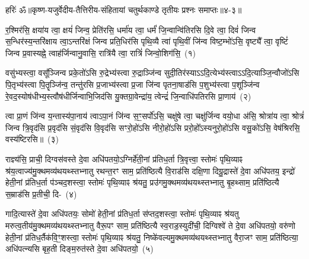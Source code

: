 {हरिः॑ ॐ}{॥कृष्ण-यजुर्वेदीय-तैत्तिरीय-संहितायां चतुर्थकाण्डे तृतीयः प्रश्नः समाप्तः॥४-३॥}

\setcounter{anuvakam}{0}
र॒श्मिर॑सि॒ क्षया॑य त्वा॒ क्षयं॑ जिन्व॒ प्रेति॑रसि॒ धर्मा॑य त्वा॒ धर्मं॑ जि॒न्वान्वि॑तिरसि दि॒वे त्वा॒ दिवं॑ जिन्व स॒न्धिर॑स्य॒न्तरि॑क्षाय त्वा॒ऽन्तरि॑क्षं जिन्व प्रति॒धिर॑सि पृथि॒व्यै त्वा॑ पृथि॒वीं जि॑न्व विष्ट॒म्भो॑\-ऽसि॒ वृष्ट्यै᳚ त्वा॒ वृष्टिं॑ जिन्व प्र॒वास्यह्ने॒ त्वाह॑र्जिन्वानु॒वासि॒ रात्रि॑यै त्वा॒ रात्रिं॑ जिन्वो॒शिग॑सि॒~(१)

वसु॑भ्यस्त्वा॒ वसू᳚ञ्जिन्व प्रके॒तो॑\-ऽसि रु॒द्रेभ्य॑स्त्वा रु॒द्राञ्जि॑न्व सुदी॒तिर॑स्याऽऽदि॒त्येभ्य॑स्त्वा\-ऽऽ\-दि॒त्याञ्जि॒न्वौजो॑\-ऽसि पि॒तृभ्य॑स्त्वा पि॒तॄञ्जि॑न्व॒ तन्तु॑रसि प्र॒जाभ्य॑स्त्वा प्र॒जा जि॑न्व पृतना॒षाड॑सि प॒शुभ्य॑स्त्वा प॒शूञ्जि॑न्व रे॒वद॒स्योष॑धीभ्य॒स्त्वौष॑धीर्जिन्वाभि॒जिद॑सि यु॒क्तग्रा॒वेन्द्रा॑य॒ त्वेन्द्रं॑ जि॒न्वाधि॑\-पतिरसि प्रा॒णाय॑~(२)

त्वा प्रा॒णं जि॑न्व य॒न्तास्य॑पा॒नाय॑ त्वाऽपा॒नं जि॑न्व स॒ꣳ॒सर्पो॑\-ऽसि॒ चक्षु॑षे त्वा॒ चक्षु॑र्जिन्व वयो॒धा अ॑सि॒ श्रोत्रा॑य त्वा॒ श्रोत्रं॑ जिन्व त्रि॒वृद॑सि प्र॒वृद॑सि सं॒वृद॑सि वि॒वृद॑सि सꣳरो॒हो॑\-ऽसि नीरो॒हो॑\-ऽसि प्ररो॒हो᳚\-ऽस्यनुरो॒हो॑\-ऽसि वसु॒को॑\-ऽसि॒ वेष॑श्रिरसि॒ वस्य॑ष्टिरसि॥~(३)

{\anuvakamend[{उ॒शिग॑सि प्रा॒णाय॒ त्रिच॑त्वारिꣳशच्च}]}%

राज्ञ्य॑सि॒ प्राची॒ दिग्वस॑वस्ते दे॒वा अधि॑पतयो॒\-ऽग्निर्\mbox{}हे॑ती॒नां प्र॑तिध॒र्ता त्रि॒वृत्त्वा॒ स्तोमः॑ पृथि॒व्याꣴ श्र॑य॒त्वाज्य॑मु॒क्थ\-मव्य॑थयथ्स्तभ्नातु रथन्त॒रꣳ साम॒ प्रति॑ष्ठित्यै वि॒राड॑सि दक्षि॒णा दिग्रु॒द्रास्ते॑ दे॒वा अधि॑पतय॒ इन्द्रो॑ हेती॒नां प्र॑तिध॒र्ता प॑ञ्चद॒शस्त्वा॒ स्तोमः॑ पृथि॒व्याꣴ श्र॑यतु॒ प्रउ॑गमु॒क्थमव्य॑थयथ्स्तभ्नातु बृ॒हथ्साम॒ प्रति॑ष्ठित्यै स॒म्राड॑सि प्र॒तीची॒ दि-~(४)

गादि॒त्यास्ते॑ दे॒वा अधि॑पतयः॒ सोमो॑ हेती॒नां प्र॑तिध॒र्ता स॑प्तद॒शस्त्वा॒ स्तोमः॑ पृथि॒व्याꣴ श्र॑यतु मरुत्व॒तीय॑मु॒क्थ\-मव्य॑थयथ्स्तभ्नातु वैरू॒पꣳ साम॒ प्रति॑ष्ठित्यै स्व॒राड॒स्युदी॑ची॒ दिग्विश्वे॑ ते दे॒वा अधि॑पतयो॒ वरु॑णो हेती॒नां प्र॑तिध॒र्तैक॑\-वि॒ꣳ॒शस्त्वा॒ स्तोमः॑ पृथि॒व्याꣴ श्र॑यतु॒ निष्के॑वल्यमु॒क्थमव्य॑थयथ्स्तभ्नातु वैरा॒जꣳ साम॒ प्रति॑ष्ठित्या॒ अधि॑पत्न्यसि बृह॒ती दिङ्म॒रुत॑स्ते दे॒वा अधि॑पतयो॒~(५)

